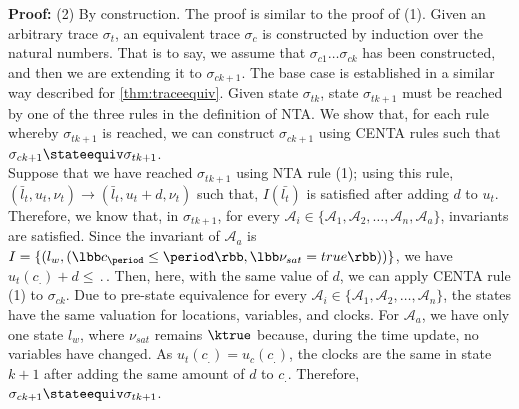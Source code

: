 \textbf{Proof: }(2) By construction.  The proof is similar to the proof of (1). Given an arbitrary trace $\sigma_{t}$, an equivalent trace $\sigma_{c}$ is constructed by induction over the natural numbers. That is to say, we assume that $\sigma_{c1} \ldots \sigma_{ck}$ has been constructed, and then we are extending it to $\sigma_{ck+1}$. The base case is established in a similar way described for \ref{thm:traceequiv}. Given state $\sigma_{tk}$, state $\sigma_{tk+1}$ must be reached by one of the three rules in the definition of NTA. We show that, for each rule whereby $\sigma_{tk+1}$ is reached, we can construct $\sigma_{ck+1}$ using CENTA rules such that $\sigma_{ck+1} \stateequiv \sigma_{tk+1}$.\\
Suppose that we have reached $\sigma_{tk+1}$ using NTA rule (1); using this rule, $(\bar{l}_{t},u_{t}, \nu_{t}) \rightarrow (\bar{l}_{t}, u_{t}+d, \nu_{t})$ such that, $I(\bar{l_{t}})$ is satisfied after adding $d$ to $u_{t}$. Therefore, we know that, in $\sigma_{tk+1}$, for every $\mathcal{A}_{i} \in \{\mathcal{A}_1,\mathcal{A}_2, \ldots,\mathcal{A}_n,\mathcal{A}_a \}$, invariants are satisfied. Since the invariant of $\mathcal{A}_a$ is
$I = \{(l_{w},(\lbb c_{\period} \le \period \rbb, \lbb \nu_{sat} = true \rbb))\}$, we have
$u_{t}(c_{\period}) +d \le \period$. Then, here, with the same value of $d$, we can apply CENTA rule (1) to $\sigma_{ck}$.  Due to pre-state equivalence for every $\mathcal{A}_{i} \in \{\mathcal{A}_1,\mathcal{A}_2, \ldots,\mathcal{A}_n\}$, the states have the same valuation for locations, variables, and clocks. For $\mathcal{A}_a$, we have only one state $l_{w}$, where $\nu_{sat}$ remains $\ktrue$ because, during the time update, no variables have changed. As $u_{t}(c_{\period})=u_{c}(c_{\period})$, the clocks are the same in state $k+1$ after adding the same amount of $d$ to $c_{\period}$. Therefore, $\sigma_{ck+1} \stateequiv \sigma_{tk+1}$.


 